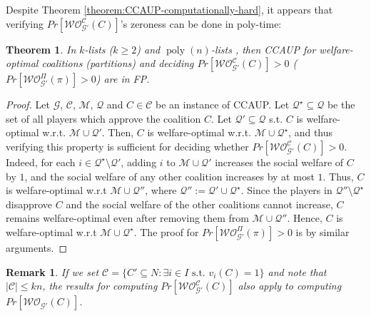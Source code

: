 \documentclass[letterpaper]{article}
\newtheorem{theorem}{Theorem}
\newtheorem{remark}{Remark}
\DeclareMathOperator*{\poly}{poly}
\begin{document}
Despite Theorem \ref{theorem:CCAUP-computationally-hard}, it appears that verifying $Pr[\mathcal{WO}^{\mathcal{C}}_{\mathcal{G}'}(C)]$'s zeroness can be done in poly-time:
\begin{theorem}
\label{theorem:zeroness}
In $k$-lists ($k \geq 2$) and $\poly(n)$-lists%
, then CCAUP for welfare-optimal coalitions (partitions) and deciding $Pr[\mathcal{WO}^{\mathcal{C}}_{\mathcal{G}'}(C)] > 0$ ($Pr[\mathcal{WO}^{\Pi}_{\mathcal{G}'}(\pi)] > 0$) are in FP.
\end{theorem}
\begin{proof}
Let $\mathcal{G}$, $\mathcal{C}$, $\mathcal{M}$, $\mathcal{Q}$ and $C \in \mathcal{C}$ be an instance of CCAUP. Let $\mathcal{Q}^\star \subseteq \mathcal{Q}$ be the set of all players which approve the coalition $C$. Let $\mathcal{Q}' \subseteq \mathcal{Q}$ s.t. $C$ is welfare-optimal w.r.t. $\mathcal{M} \cup \mathcal{Q}'$. Then, $C$ is welfare-optimal w.r.t. $\mathcal{M} \cup \mathcal{Q}^\star$, and thus verifying this property is sufficient for deciding whether $Pr[\mathcal{WO}^{\mathcal{C}}_{\mathcal{G}'}(C)] > 0$. Indeed, for each $i \in \mathcal{Q}^\star \setminus \mathcal{Q}'$, adding $i$ to $\mathcal{M} \cup \mathcal{Q}'$ increases the social welfare of $C$ by $1$, and the social welfare of any other coalition increases by at most $1$. Thus, $C$ is welfare-optimal w.r.t $\mathcal{M} \cup \mathcal{Q}''$, where $  \mathcal{Q}'' := \mathcal{Q}' \cup \mathcal{Q}^\star$. Since the players in $ \mathcal{Q}'' \setminus  \mathcal{Q}^\star$ disapprove $C$ and the social welfare of the other coalitions cannot increase, $C$ remains welfare-optimal even after removing them from $\mathcal{M} \cup \mathcal{Q}''$. Hence, $C$ is welfare-optimal w.r.t $\mathcal{M} \cup \mathcal{Q}^\star$. The proof for $Pr[\mathcal{WO}^{\Pi}_{\mathcal{G}'}(\pi)] > 0$ is by similar arguments.
\end{proof}

\begin{remark}
If we set $\mathcal{C} = \{C' \subseteq N : \exists i \in I \text{ s.t. } v_i(C) = 1\}$ and note that $|\mathcal{C}| \leq kn$, the results for computing $Pr[\mathcal{WO}^{\mathcal{C}}_{\mathcal{G}'}(C)]$ also apply to computing $Pr[\mathcal{WO}_{\mathcal{G}'}(C)]$.
\end{remark}
\end{document}
